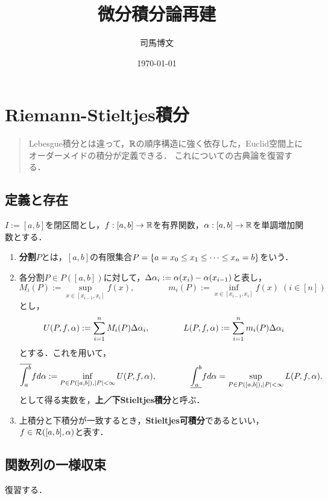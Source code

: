 \documentclass[uplatex, dvipdfmx]{jsreport}
\title{微分積分論再建}
\author{司馬博文}
\date{\today}
\begin{document}
\tableofcontents

\chapter{Riemann-Stieltjes積分}

\begin{quotation}
    Lebesgue積分とは違って，$\mathbb{R}$の順序構造に強く依存した，Euclid空間上にオーダーメイドの積分が定義できる．
    これについての古典論を復習する．
\end{quotation}

\section{定義と存在}

\begin{definition}
    $I:=[a,b]$を閉区間とし，$f:[a,b]\to\mathbb{R}$を有界関数，$\alpha:[a,b]\to\mathbb{R}$を単調増加関数とする．
    \begin{enumerate}
        \item \textbf{分割}$P$とは，$[a,b]$の有限集合$P=\left\{a=x_0\le x_1\le\cdots\le x_n=b\right\}$をいう．
        \item 各分割$P\in P([a,b])$に対して，$\Delta\alpha_i:=\alpha(x_i)-\alpha(x_{i-1})$と表し，
        \[M_i(P):=\sup_{x\in[x_{i-1},x_i]}f(x),\qquad\qquad m_i(P):=\inf_{x\in[x_{i-1},x_i]}f(x)\;(i\in[n])\]
        とし，
        \[U(P,f,\alpha):=\sum^n_{i=1}M_i(P)\Delta\alpha_i,\qquad\qquad L(P,f,\alpha):=\sum^n_{i=1}m_i(P)\Delta\alpha_i\]
        とする．これを用いて，
        \[\overline{\int^b_a}fd\alpha:=\inf_{P\in P([a,b]),\lvert P\rvert<\infty}U(P,f,\alpha),\qquad\qquad\underline{\int^b_a}fd\alpha=\sup_{P\in P([a,b]),\lvert P\rvert<\infty}L(P,f,\alpha).\]
        として得る実数を，\textbf{上／下Stieltjes積分}と呼ぶ．
        \item 上積分と下積分が一致するとき，\textbf{Stieltjes可積分}であるといい，$f\in\mathcal{R}([a,b],\alpha)$と表す．
    \end{enumerate}
\end{definition}

\section{関数列の一様収束}

\begin{tcolorbox}[colframe=ForestGreen, colback=ForestGreen!10!white,breakable,colbacktitle=ForestGreen!40!white,coltitle=black,fonttitle=\bfseries\sffamily,
title=]
    復習する．
\end{tcolorbox}
\end{document}
